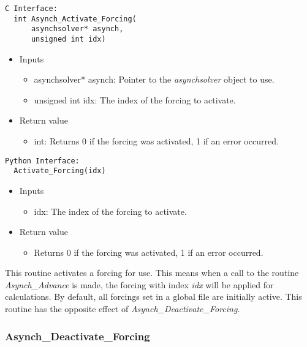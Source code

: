 \documentclass[12pt]{article}
\begin{document}
\begin{lstlisting}[style=CStyle]
  C Interface:
  int Asynch_Activate_Forcing(
      asynchsolver* asynch,
      unsigned int idx)
\end{lstlisting}
\begin{itemize}
 \item Inputs
  \begin{itemize}
   \item asynchsolver* asynch: Pointer to the \emph{asynchsolver} object to use.
   \item unsigned int idx: The index of the forcing to activate.
  \end{itemize}
 \item Return value
  \begin{itemize}
   \item int: Returns 0 if the forcing was activated, 1 if an error occurred.
  \end{itemize}
\end{itemize}
\begin{lstlisting}[style=PythonStyle]
  Python Interface:
  Activate_Forcing(idx)
\end{lstlisting}
\begin{itemize}
 \item Inputs
  \begin{itemize}
   \item idx: The index of the forcing to activate.
  \end{itemize}
 \item Return value
  \begin{itemize}
   \item Returns 0 if the forcing was activated, 1 if an error occurred.
  \end{itemize}
\end{itemize}
This routine activates a forcing for use. This means when a call to the routine \emph{Asynch\_Advance} is made, the forcing with index \emph{idx} will be applied for calculations. By default, all forcings set in a global file are initially active. This routine has the opposite effect of \emph{Asynch\_Deactivate\_Forcing}.


\subsubsection{Asynch\_Deactivate\_Forcing} \label{sec: asynch_deactivate_forcing}
\end{document}
